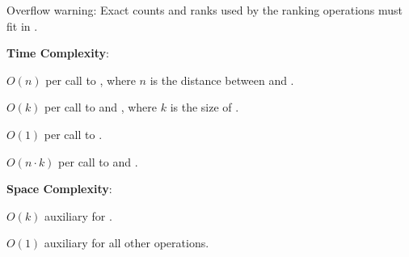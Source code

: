 Overflow warning: Exact counts and ranks used by the ranking operations must fit in .

\textbf{Time Complexity}:
\begin{compactitem}
  \item $O(n)$ per call to , where $n$ is the distance between  and .
  \item $O(k)$ per call to  and , where $k$ is the size of .
  \item $O(1)$ per call to .
  \item $O(n \cdot k)$ per call to  and .
\end{compactitem}

\textbf{Space Complexity}:
\begin{compactitem}
  \item $O(k)$ auxiliary for .
  \item $O(1)$ auxiliary for all other operations.
\end{compactitem}

